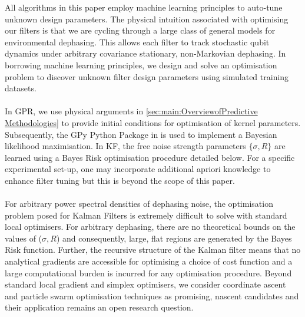 All algorithms in this paper employ machine learning principles to auto-tune unknown design parameters. The physical intuition associated with optimising our filters is that we are cycling through a large class of general models for environmental dephasing. This allows each filter to track stochastic qubit dynamics under arbitrary covariance stationary, non-Markovian dephasing. In borrowing machine learning principles, we design and solve an optimisation problem to discover unknown filter design parameters using simulated training datasets. 
\\
\\
In GPR, we use physical arguments in \cref{sec:main:OverviewofPredictive Methodologies} to provide initial conditions for optimisation of kernel parameters. Subsequently, the GPy Python Package in \cite{gpy2014} is used to implement a Bayesian likelihood maximisation. In KF, the free noise strength parameters $\{ \sigma, R \}$ are learned using a Bayes Risk optimisation procedure detailed below. For a specific experimental set-up, one may incorporate additional apriori knowledge to enhance filter tuning but this is beyond the scope of this paper. 
\\
\\
For arbitrary power spectral densities of dephasing noise, the optimisation problem posed for Kalman Filters is extremely difficult to solve with standard local optimisers. For arbitrary dephasing, there are no theoretical bounds on the values of ($\sigma, R$) and consequently, large, flat regions are generated by the Bayes Risk function. Further, the recursive structure of the Kalman filter means that no analytical gradients are accessible for optimising a choice of cost function and a large computational burden is incurred for any optimisation procedure. Beyond standard local gradient and simplex optimisers, we consider coordinate ascent \cite{abbeel2005} and particle swarm optimisation techniques as promising, nascent candidates and their application remains an open research question. 
\\
\\
